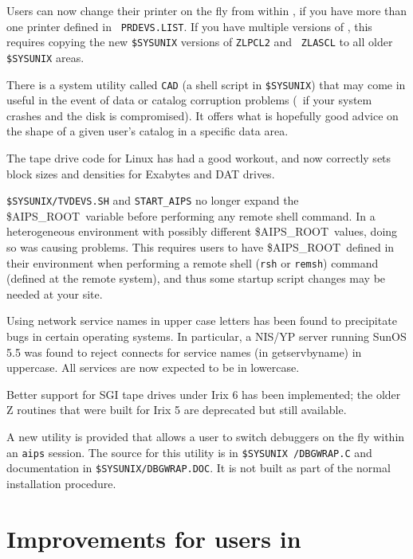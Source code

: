 \begin{description}

 Users can now change their printer on the fly
from within \AIPS, if you have more than one printer defined in {\tt
PRDEVS.LIST}.  If you have multiple versions of \AIPS, this requires
copying the new {\tt\$SYSUNIX} versions of {\tt ZLPCL2} and {\tt
ZLASCL} to all older {\tt\$SYSUNIX} areas.

 There is a system utility called {\tt CAD} (a shell
script in {\tt \$SYSUNIX}) that may come in useful in the event of
data or catalog corruption problems (\eg\ if your system crashes and
the disk is compromised).  It offers what is hopefully good advice on
the shape of a given user's catalog in a specific data area.

 \hskip 0.5cm The tape drive code for Linux has
had a good workout, and now correctly sets block sizes and densities
for Exabytes and DAT drives.

 {\tt\$SYSUNIX/TVDEVS.SH} and {\tt START\_AIPS}
no longer expand the \$AIPS\_ROOT\ variable before performing any
remote shell command.  In a heterogeneous environment with possibly
different \$AIPS\_ROOT\ values, doing so was causing problems.  This
requires users to have \$AIPS\_ROOT\ defined in their environment when
performing a remote shell ({\tt rsh} or {\tt remsh}) command (defined
at the remote system), and thus some startup script changes may be
needed at your site.

 \hskip 1cm Using network service names in upper
case letters has been found to precipitate bugs in certain operating
systems.  In particular, a NIS/YP server running SunOS 5.5 was found
to reject connects for service names (in getservbyname) in uppercase.
All services are now expected to be in lowercase.

 Better support for SGI tape drives under Irix 6
has been implemented; the older Z routines that were built for Irix 5
are deprecated but still available.

 A new utility is provided that allows a user to switch
debuggers on the fly within an {\tt aips} session.  The source for
this utility is in {\tt\$SYSUNIX /DBGWRAP.C} and documentation in
{\tt\$SYSUNIX/DBGWRAP.DOC}.  It is not built as part of the normal
installation procedure.

\end{description}

\section{Improvements for users in \RELEASENAME}

